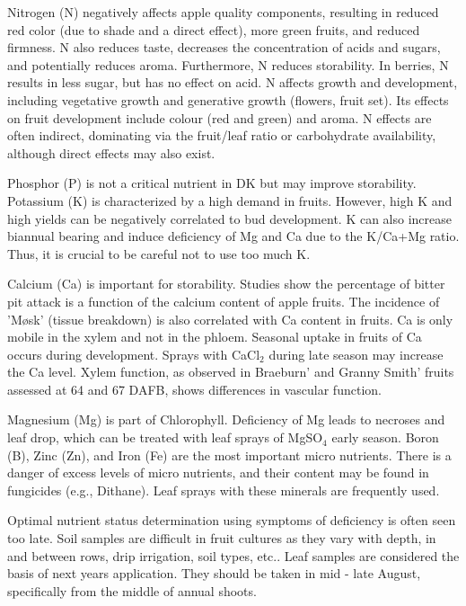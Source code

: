 \vspace{0.5em}
Nitrogen (N) negatively affects apple quality components, resulting in reduced red color (due to shade and a direct effect), more green fruits, and reduced firmness. N also reduces taste, decreases the concentration of acids and sugars, and potentially reduces aroma. Furthermore, N reduces storability. In berries, N results in less sugar, but has no effect on acid. N affects growth and development, including vegetative growth and generative growth (flowers, fruit set). Its effects on fruit development include colour (red and green) and aroma. N effects are often indirect, dominating via the fruit/leaf ratio or carbohydrate availability, although direct effects may also exist.

\vspace{0.5em}
Phosphor (P) is not a critical nutrient in DK but may improve storability.
Potassium (K) is characterized by a high demand in fruits. However, high K and high yields can be negatively correlated to bud development. K can also increase biannual bearing and induce deficiency of Mg and Ca due to the K/Ca+Mg ratio. Thus, it is crucial to be careful not to use too much K.

\vspace{0.5em}
Calcium (Ca) is important for storability. Studies show the percentage of bitter pit attack is a function of the calcium content of apple fruits. The incidence of 'Møsk' (tissue breakdown) is also correlated with Ca content in fruits. Ca is only mobile in the xylem and not in the phloem. Seasonal uptake in fruits of Ca occurs during development. Sprays with CaCl$_2$ during late season may increase the Ca level. Xylem function, as observed in Braeburn' and Granny Smith' fruits assessed at 64 and 67 DAFB, shows differences in vascular function.

\vspace{0.5em}
Magnesium (Mg) is part of Chlorophyll. Deficiency of Mg leads to necroses and leaf drop, which can be treated with leaf sprays of MgSO$_4$ early season. Boron (B), Zinc (Zn), and Iron (Fe) are the most important micro nutrients. There is a danger of excess levels of micro nutrients, and their content may be found in fungicides (e.g., Dithane). Leaf sprays with these minerals are frequently used.

\vspace{0.5em}
Optimal nutrient status determination using symptoms of deficiency is often seen too late. Soil samples are difficult in fruit cultures as they vary with depth, in and between rows, drip irrigation, soil types, etc.. Leaf samples are considered the basis of next years application. They should be taken in mid - late August, specifically from the middle of annual shoots.

